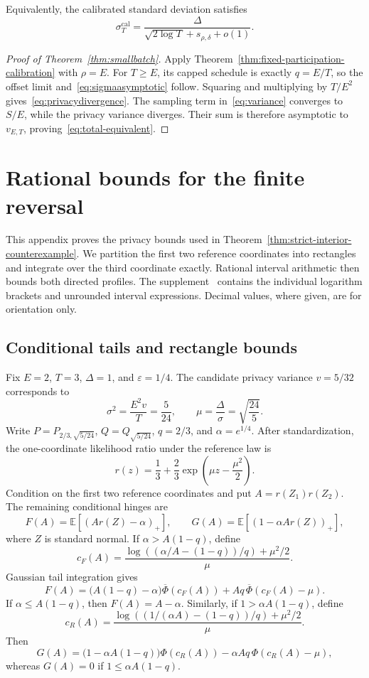 \documentclass[11pt]{article}
\theoremstyle{remark}
\newcommand{\E}{\mathbb E}
\begin{document}
Equivalently, the calibrated standard deviation satisfies
\begin{equation}\label{eq:offset-approximation}
 \sigma_T^{\mathrm{cal}}
 =\frac\Delta{\sqrt{2\log T}+s_{\rho,\delta}+o(1)}.
\end{equation}

\begin{proof}[Proof of Theorem~\ref{thm:smallbatch}]
Apply Theorem~\ref{thm:fixed-participation-calibration} with $\rho=E$.
For $T\geq E$, its capped schedule is exactly $q=E/T$, so the offset limit
and~\eqref{eq:sigmaasymptotic} follow. Squaring and multiplying by $T/E^2$
gives~\eqref{eq:privacydivergence}. The sampling term in~\eqref{eq:variance}
converges to $S/E$, while the privacy variance diverges. Their sum is
therefore asymptotic to $v_{E,T}$, proving~\eqref{eq:total-equivalent}.
\end{proof}

\section{Rational bounds for the finite reversal}\label{app:rational-calculation}
This appendix proves the privacy bounds used in
Theorem~\ref{thm:strict-interior-counterexample}. We partition the first two
reference coordinates into rectangles and integrate over the third
coordinate exactly. Rational interval arithmetic then bounds both directed
profiles. The supplement~\cite{rational-supplement} contains the individual
logarithm brackets and unrounded interval expressions. Decimal values, where
given, are for orientation only.

\subsection{Conditional tails and rectangle bounds}
Fix $E=2$, $T=3$, $\Delta=1$, and $\varepsilon=1/4$. The candidate
privacy variance $v=5/32$ corresponds to
\[
 \sigma^2=\frac{E^2v}{T}=\frac5{24},\qquad
 \mu=\frac\Delta\sigma=\sqrt{\frac{24}{5}}.
\]
Write $P=P_{2/3,\sqrt{5/24}}$, $Q=Q_{\sqrt{5/24}}$, $q=2/3$, and
$\alpha=e^{1/4}$. After standardization, the one-coordinate likelihood ratio
under the reference law is
\[
 r(z)=\frac13+\frac23\exp\left(\mu z-\frac{\mu^2}{2}\right).
\]
Condition on the first two reference coordinates and put
$A=r(Z_1)r(Z_2)$. The remaining conditional hinges are
\[
 F(A)=\E[(Ar(Z)-\alpha)_+],\qquad
 G(A)=\E[(1-\alpha Ar(Z))_+],
\]
where $Z$ is standard normal. If $\alpha>A(1-q)$, define
\[
 c_F(A)=\frac{\log((\alpha/A-(1-q))/q)+\mu^2/2}{\mu}.
\]
Gaussian tail integration gives
\[
 F(A)=\bigl(A(1-q)-\alpha\bigr)\overline\Phi(c_F(A))
       +Aq\,\overline\Phi(c_F(A)-\mu).
\]
If $\alpha\leq A(1-q)$, then $F(A)=A-\alpha$. Similarly, if
$1>\alpha A(1-q)$, define
\[
 c_R(A)=\frac{\log((1/(\alpha A)-(1-q))/q)+\mu^2/2}{\mu}.
\]
Then
\[
 G(A)=\bigl(1-\alpha A(1-q)\bigr)\Phi(c_R(A))
       -\alpha Aq\,\Phi(c_R(A)-\mu),
\]
whereas $G(A)=0$ if $1\leq\alpha A(1-q)$.
\end{document}
